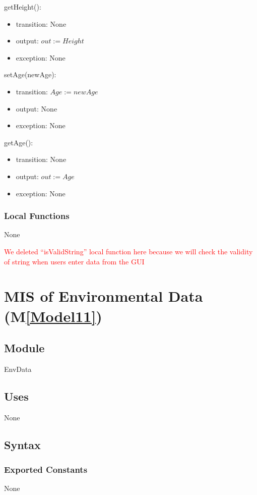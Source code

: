 \documentclass[12pt, titlepage]{article}
\newcommand{\mref}[1]{M\ref{#1}}
\begin{document}
\noindent getHeight():
\begin{itemize}
\item transition: None
\item output: $\mathit{out := Height}$
\item exception: None
\end{itemize}
\noindent setAge(newAge):
\begin{itemize}
\item transition: $\mathit{Age := newAge}$
\item output: None
\item exception: None
\end{itemize}
\noindent getAge():
\begin{itemize}
\item transition: None
\item output: $\mathit{out := Age}$
\item exception: None
\end{itemize}

\subsubsection{Local Functions}
None

\newpage

\noindent
\textcolor{red}{We deleted ``isValidString'' local 
function here because we will 
check the validity of string when users enter data from the GUI}
\section{MIS of Environmental Data (\mref{Model11})}

\subsection{Module}
EnvData

\subsection{Uses}
None

\subsection{Syntax}
\subsubsection{Exported Constants}
None
\end{document}
